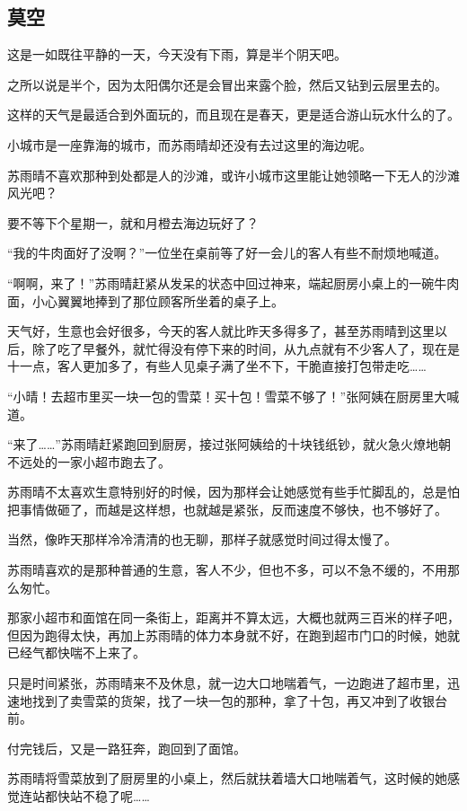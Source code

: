\subsection{莫空}

这是一如既往平静的一天，今天没有下雨，算是半个阴天吧。

之所以说是半个，因为太阳偶尔还是会冒出来露个脸，然后又钻到云层里去的。

这样的天气是最适合到外面玩的，而且现在是春天，更是适合游山玩水什么的了。

小城市是一座靠海的城市，而苏雨晴却还没有去过这里的海边呢。

苏雨晴不喜欢那种到处都是人的沙滩，或许小城市这里能让她领略一下无人的沙滩风光吧？

要不等下个星期一，就和月橙去海边玩好了？

“我的牛肉面好了没啊？”一位坐在桌前等了好一会儿的客人有些不耐烦地喊道。

“啊啊，来了！”苏雨晴赶紧从发呆的状态中回过神来，端起厨房小桌上的一碗牛肉面，小心翼翼地捧到了那位顾客所坐着的桌子上。

天气好，生意也会好很多，今天的客人就比昨天多得多了，甚至苏雨晴到这里以后，除了吃了早餐外，就忙得没有停下来的时间，从九点就有不少客人了，现在是十一点，客人更加多了，有些人见桌子满了坐不下，干脆直接打包带走吃……

“小晴！去超市里买一块一包的雪菜！买十包！雪菜不够了！”张阿姨在厨房里大喊道。

“来了……”苏雨晴赶紧跑回到厨房，接过张阿姨给的十块钱纸钞，就火急火燎地朝不远处的一家小超市跑去了。

苏雨晴不太喜欢生意特别好的时候，因为那样会让她感觉有些手忙脚乱的，总是怕把事情做砸了，而越是这样想，也就越是紧张，反而速度不够快，也不够好了。

当然，像昨天那样冷冷清清的也无聊，那样子就感觉时间过得太慢了。

苏雨晴喜欢的是那种普通的生意，客人不少，但也不多，可以不急不缓的，不用那么匆忙。

那家小超市和面馆在同一条街上，距离并不算太远，大概也就两三百米的样子吧，但因为跑得太快，再加上苏雨晴的体力本身就不好，在跑到超市门口的时候，她就已经气都快喘不上来了。

只是时间紧张，苏雨晴来不及休息，就一边大口地喘着气，一边跑进了超市里，迅速地找到了卖雪菜的货架，找了一块一包的那种，拿了十包，再又冲到了收银台前。

付完钱后，又是一路狂奔，跑回到了面馆。

苏雨晴将雪菜放到了厨房里的小桌上，然后就扶着墙大口地喘着气，这时候的她感觉连站都快站不稳了呢……


